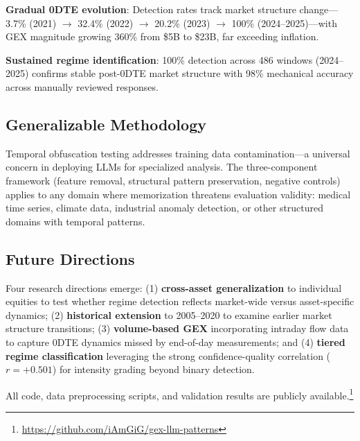 \textbf{Gradual 0DTE evolution}: Detection rates track market structure change---3.7\% (2021) $\rightarrow$ 32.4\% (2022) $\rightarrow$ 20.2\% (2023) $\rightarrow$ 100\% (2024--2025)---with GEX magnitude growing 360\% from \$5B to \$23B, far exceeding inflation.

\textbf{Sustained regime identification}: 100\% detection across 486 windows (2024--2025) confirms stable post-0DTE market structure with 98\% mechanical accuracy across manually reviewed responses.

\subsection{Generalizable Methodology}

Temporal obfuscation testing addresses training data contamination---a universal concern in deploying LLMs for specialized analysis. The three-component framework (feature removal, structural pattern preservation, negative controls) applies to any domain where memorization threatens evaluation validity: medical time series, climate data, industrial anomaly detection, or other structured domains with temporal patterns.

\subsection{Future Directions}

Four research directions emerge: (1) \textbf{cross-asset generalization} to individual equities to test whether regime detection reflects market-wide versus asset-specific dynamics; (2) \textbf{historical extension} to 2005--2020 to examine earlier market structure transitions; (3) \textbf{volume-based GEX} incorporating intraday flow data to capture 0DTE dynamics missed by end-of-day measurements; and (4) \textbf{tiered regime classification} leveraging the strong confidence-quality correlation ($r = +0.501$) for intensity grading beyond binary detection.

All code, data preprocessing scripts, and validation results are publicly available.\footnote{\url{https://github.com/iAmGiG/gex-llm-patterns}}
